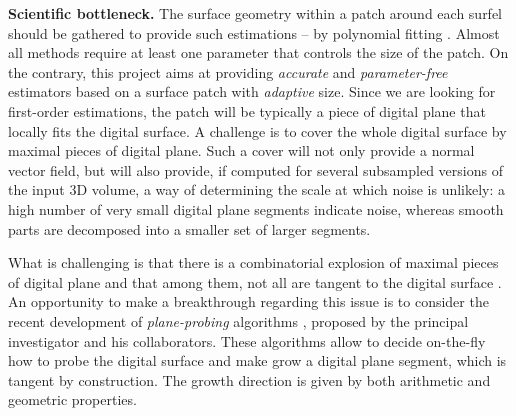 \noindent\textbf{Scientific bottleneck.}
The surface geometry within a patch around each surfel should be gathered to provide such estimations
-- \eg by polynomial fitting \cite{Cazals2005,Cazals2008}.
Almost all methods require at least one parameter that controls the size of the patch.  
On the contrary, this project aims at providing \emph{accurate} and \emph{parameter-free} estimators
based on a surface patch with \emph{adaptive} size.
Since we are looking for first-order estimations, the patch will be typically a piece of digital plane
that locally fits the digital surface. %
A challenge is to cover the whole digital surface by maximal pieces of digital plane. 
Such a cover will not only provide a normal vector field, but will also provide, if computed
for several subsampled versions of the input 3D volume, a way of determining the scale 
at which noise is unlikely: a high number of very small digital plane segments indicate noise, whereas
smooth parts are decomposed into a smaller set of larger segments.    

What is challenging is that there is a combinatorial explosion
of maximal pieces of digital plane \cite{Sivignon2009} and that among them,
not all are tangent to the digital surface \cite{Charrier2011}.  
An opportunity to make a breakthrough regarding this issue is to consider the recent development
of \emph{plane-probing} algorithms \cite{LPRTCS2016, LPRDGCI2016, LPRJMIV2017},
proposed by the principal investigator and his collaborators.
These algorithms allow to decide
on-the-fly how to probe the digital surface and make grow a digital plane segment,
which is tangent by construction. The growth direction is given by both arithmetic and geometric properties.

